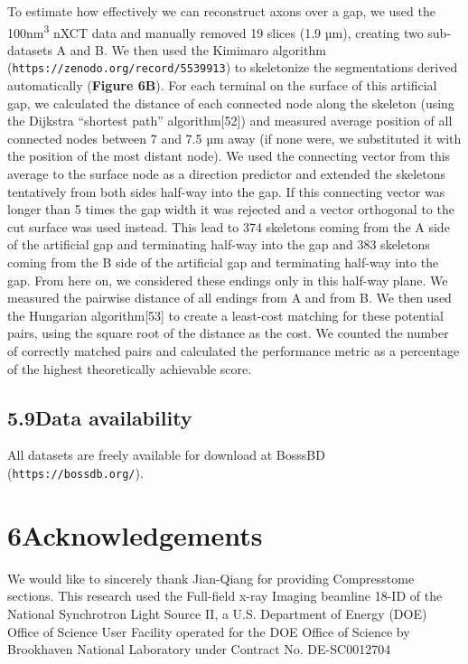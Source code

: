 \documentclass{article}
\begin{document}
To estimate how effectively we can reconstruct axons over a gap, we used the 100nm\textsuperscript{3} nXCT data and manually removed 19 slices (1.9 µm), creating two sub-datasets A and B. We then used the Kimimaro algorithm (\texttt{https://zenodo.org/record/5539913}) to skeletonize the segmentations derived automatically (\textbf{Figure 6B}). For each terminal on the surface of this artificial gap, we calculated the distance of each connected node along the skeleton (using the Dijkstra “shortest path” algorithm[52]) and measured average position of all connected nodes between 7 and 7.5 µm away (if none were, we substituted it with the position of the most distant node). We used the connecting vector from this average to the surface node as a direction predictor and extended the skeletons tentatively from both sides half-way into the gap. If this connecting vector was longer than 5 times the gap width it was rejected and a vector orthogonal to the cut surface was used instead. This lead to 374 skeletons coming from the A side of the artificial gap and terminating half-way into the gap and 383 skeletons coming from the B side of the artificial gap and terminating half-way into the gap. From here on, we considered these endings only in this half-way plane. We measured the pairwise distance of all endings from A and from B. We then used the Hungarian algorithm[53] to create a least-cost matching for these potential pairs, using the square root of the distance as the cost. We counted the number of correctly matched pairs and calculated the performance metric as a percentage of the highest theoretically achievable score.

\subsection*{5.9\quad Data availability}

All datasets are freely available for download at BosssBD (\texttt{https://bossdb.org/}).

\section*{6\quad Acknowledgements}

We would like to sincerely thank Jian-Qiang for providing Compresstome sections. This research used the Full-field x-ray Imaging beamline 18-ID of the National Synchrotron Light Source II, a U.S. Department of Energy (DOE) Office of Science User Facility operated for the DOE Office of Science by Brookhaven National Laboratory under Contract No. DE-SC0012704
\end{document}

